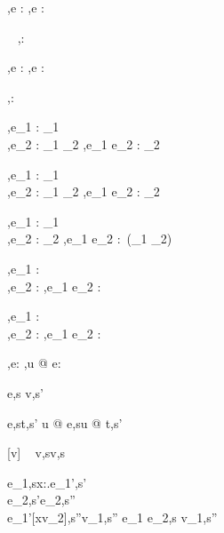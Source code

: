   {\Gamma,\Sigma \infers e : \tau}
  {\Gamma,\Sigma \infers \Edit e : \Task \tau}

  {\ }
  {\Gamma,\Sigma \infers \Enter \tau : \Task \tau}

  {\Gamma,\Sigma \infers e : \Reference \tau}
  {\Gamma,\Sigma \infers \Update e : \Task \tau}


  { }
  {\Gamma,\Sigma \infers \Fail : \Task \tau}


  {\Gamma,\Sigma \infers e_1 : \Task \tau_1 \\
   \Gamma,\Sigma \infers e_2 : \tau_1 \to \Task \tau_2}
  {\Gamma,\Sigma \infers e_1 \Then e_2 : \Task \tau_2}


  {\Gamma,\Sigma \infers e_1 : \Task \tau_1 \\
   \Gamma,\Sigma \infers e_2 : \tau_1 \to \Task \tau_2}
  {\Gamma,\Sigma \infers e_1 \Next e_2 : \Task \tau_2}


  {\Gamma,\Sigma \infers e_1 : \Task \tau_1 \\
   \Gamma,\Sigma \infers e_2 : \Task \tau_2}
  {\Gamma,\Sigma \infers e_1 \And e_2 : \Task\,(\tau_1 \times \tau_2)}


  {\Gamma,\Sigma \infers e_1 : \Task \tau \\
   \Gamma,\Sigma \infers e_2 : \Task \tau }
  {\Gamma,\Sigma \infers e_1 \Or e_2 : \Task \tau}


  {\Gamma,\Sigma \infers e_1 : \Task \tau \\
   \Gamma,\Sigma \infers e_2 : \Task \tau }
  {\Gamma,\Sigma \infers e_1 \Xor e_2 : \Task \tau}

  {\Gamma,\Sigma\infers e:\Task\tau}
  {\Gamma,\Sigma\infers u @ e:\Task\tau}





  {e,s \evaluate v,s'}

    {e,s\evaluate t,s'}
    {u @ e,s\evaluate u @ t,s'}

[v\in{}]
  {\ }
  {v,s\evaluate v,s}

  {e_1,s\evaluate \lambda x:\tau.e_1',s'\\
   e_2,s'\evaluate e_2,s''\\
   e_1'[x\mapsto v_2],s''\evaluate v_1,s''}
  {e_1 e_2,s \evaluate v_1,s''}

